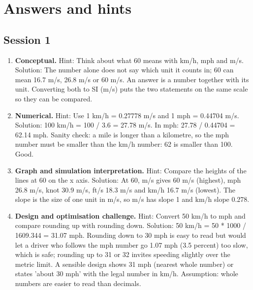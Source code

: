 \documentclass[11pt,a4paper]{article}
\begin{document}
\section{Answers and hints}

\subsection*{Session 1}
\begin{enumerate}[nosep]
\item \textbf{Conceptual.} Hint: Think about what 60 means with km/h, mph and m/s. Solution: The number alone does not say which unit it counts in; 60 can mean 16.7 m/s, 26.8 m/s or 60 m/s. An answer is a number together with its unit. Converting both to SI (m/s) puts the two statements on the same scale so they can be compared.
\item \textbf{Numerical.} Hint: Use 1 km/h = 0.27778 m/s and 1 mph = 0.44704 m/s. Solution: 100 km/h = 100 / 3.6 = 27.78 m/s. In mph: 27.78 / 0.44704 = 62.14 mph. Sanity check: a mile is longer than a kilometre, so the mph number must be smaller than the km/h number: 62 is smaller than 100. Good.
\item \textbf{Graph and simulation interpretation.} Hint: Compare the heights of the lines at 60 on the x axis. Solution: At 60, m/s gives 60 m/s (highest), mph 26.8 m/s, knot 30.9 m/s, ft/s 18.3 m/s and km/h 16.7 m/s (lowest). The slope is the size of one unit in m/s, so m/s has slope 1 and km/h slope 0.278.
\item \textbf{Design and optimisation challenge.} Hint: Convert 50 km/h to mph and compare rounding up with rounding down. Solution: 50 km/h = 50 * 1000 / 1609.344 = 31.07 mph. Rounding down to 30 mph is easy to read but would let a driver who follows the mph number go 1.07 mph (3.5 percent) too slow, which is safe; rounding up to 31 or 32 invites speeding slightly over the metric limit. A sensible design shows 31 mph (nearest whole number) or states 'about 30 mph' with the legal number in km/h. Assumption: whole numbers are easier to read than decimals.
\end{enumerate}
\end{document}
